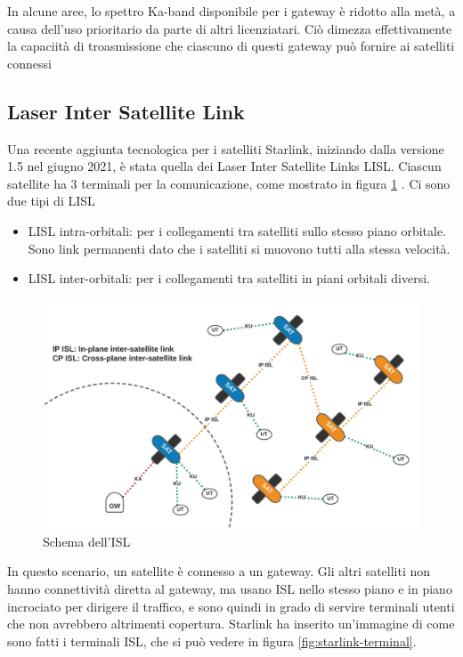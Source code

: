 In alcune aree, lo spettro \ac{Ka}-band disponibile per i gateway è ridotto alla metà, a causa dell'uso prioritario da parte di altri licenziatari. Ciò dimezza effettivamente la capaciità di troasmissione che ciascuno di questi gateway può fornire ai satelliti connessi \cite{mike_puchol_modeling_2022}

\subsection{Laser Inter Satellite Link}

Una recente aggiunta tecnologica per i satelliti Starlink, iniziando dalla versione 1.5 nel giugno 2021, è stata quella dei Laser Inter Satellite Links \ac{LISL}.
Ciascun satellite ha 3 terminali per la comunicazione, come mostrato in figura \ref{fig:starlink-ISL} \cite{mike_puchol_modeling_2022} \cite{chaudhry_laser_2021}.
Ci sono due tipi di \ac{LISL}
\begin{itemize}
  \item \ac{LISL} intra-orbitali: per i collegamenti tra satelliti sullo stesso piano orbitale. Sono link permanenti dato che i satelliti si muovono tutti alla stessa velocità.
  \item \ac{LISL} inter-orbitali: per i collegamenti tra satelliti in piani orbitali diversi.
\end{itemize}

\begin{figure}[htbp]
  \centering
  \includegraphics[width=0.9\linewidth]{./res/img/LISL_scheme.png}
  \caption{Schema dell'\ac{ISL} \cite{mike_puchol_modeling_2022}}
  \label{fig:starlink-ISL}
\end{figure}

In questo scenario, un satellite è connesso a un gateway.
Gli altri satelliti non hanno connettività diretta al gateway, ma usano \ac{ISL} nello stesso piano e in piano incrociato per dirigere il traffico, e sono quindi in grado di servire terminali utenti che non avrebbero altrimenti copertura.
Starlink ha inserito un'immagine di come sono fatti i terminali \ac{ISL}, che si può vedere in figura \ref{fig:starlink-terminal}.

